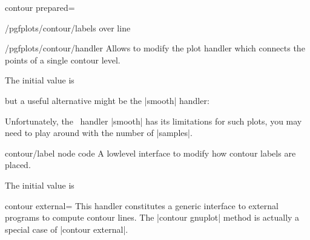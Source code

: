 {{\begin{plottype}[/pgfplots]{contour prepared=\textcolor{black}{}}
\begin{stylekey}{/pgfplots/contour/labels over line}
\begin{codeexample}[]
\end{codeexample}
	\end{stylekey}

	\begin{stylekey}{/pgfplots/contour/handler}
		Allows to modify the plot handler which connects the points of a single contour level.

		The initial value is 
\begin{codeexample}
\end{codeexample}
		but a useful alternative might be the |smooth| handler:
%
\pgfplotsexpensiveexample
\begin{codeexample}[]
\end{codeexample}
		Unfortunately, the \tikzname\ handler |smooth| has its limitations for such plots, you may need to play around with the number of |samples|.
	\end{stylekey}

	\begin{pgfplotscodekey}{contour/label node code}
		A lowlevel interface to modify how contour labels are placed.

		The initial value is
\begin{codeexample}
\end{codeexample}
	\end{pgfplotscodekey}

\end{plottype}


\begin{plottype}[/pgfplots]{contour external=\textcolor{black}{}}
	This handler constitutes a generic interface to external programs to compute contour lines. The |contour gnuplot| method is actually a special case of |contour external|.


\end{plottype}}}
